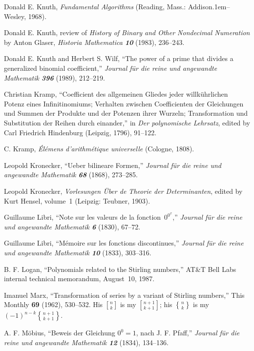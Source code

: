 \bib
[25]\enspace
Donald E. Knuth,
{\sl Fundamental Algorithms\/} (Reading, Mass.:
Addison\kern.1em--Wesley, 1968).

\bib
[26]\enspace
Donald E. Knuth, review of {\sl History of Binary and Other Nondecimal
Numeration\/} by Anton Glaser, {\sl Historia  Mathematica\/ \bf 10}
(1983), 236--243.

\bib
[27]\enspace
Donald E. Knuth and Herbert S. Wilf, ``The power of a prime that
divides a generalized binomial coefficient,'' {\sl Journal f\"ur die
reine und angewandte Mathematik\/ \bf 396} (1989), 212--219.

\bib
[28]\enspace
Christian Kramp, ``Coefficient des allgemeinen Gliedes jeder
willk\"uhrlichen Potenz eines Infinitinomiums; Verhalten zwischen
Coefficienten der Gleichungen und Summen der Produkte und der Potenzen
ihrer Wurzeln; Transformation und Substitution der Reihen durch
einander,'' in {\sl Der polynomische Lehrsatz}, edited by Carl
Friedrich Hindenburg (Leipzig, 1796), 91--122.

\bib
[29]\enspace
C. Kramp, {\sl \'El\'emens d'arithm\'etique universelle\/}
(Cologne, 1808).

\bib
[30]\enspace
Leopold Kronecker, ``Ueber bilineare Formen,''
{\sl Journal f\"ur die reine und angewandte Mathematik\/
\bf 68} (1868), 273--285.

\bib
[31]\enspace
Leopold Kronecker, {\sl Vorlesungen \"Uber de Theorie der
Determinanten}, edited by Kurt Hensel, volume~1 (Leipzig: Teubner, 1903).

\bib
[32]\enspace
Guillaume Libri, ``Note sur les valeurs de la fonction~$0^{0^x}$,''
{\sl Journal f\"ur die reine und angewandte Mathematik\/
\bf 6} (1830), 67--72.

\bib
[33]\enspace
Guillaume Libri, ``M\'emoire sur les fonctions discontinues,''
{\sl Journal f\"ur die reine und angewandte Mathematik\/
\bf 10} (1833), 303--316.

\bib
[34]\enspace
B. F. Logan, ``Polynomials related to the Stirling numbers,'' 
AT\&T Bell Labs internal technical memorandum, August~10, 1987.

\bib
[35]\enspace
Imanuel Marx, ``Transformation of series by a variant of Stirling
numbers,'' This {\sc Monthly} {\bf 69} (1962), 530--532. His ${n\brack
k}$ is my ${n+1\brack k+1}$; his ${n \brace k}$ is my
$(-1)^{n-k}{n+1\brace k+1}$.

\bib
[36]\enspace
A. F. M\"obius, ``Beweis der Gleichung $0^0=1$, nach J. F. Pfaff,''
{\sl Journal f\"ur die reine und angewandte Mathematik\/
\bf 12} (1834), 134--136.

